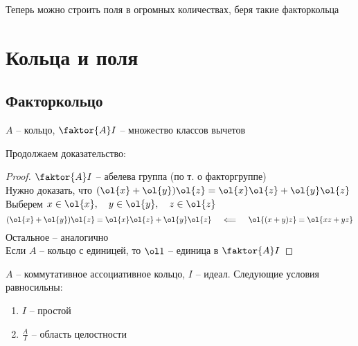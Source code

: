 Теперь можно строить поля в огромных количествах, беря такие факторкольца


\chapter{Кольца и поля}

\section{Факторкольцо}

\begin{remind}
	$ A $ -- кольцо, $ \faktor{A}I $ -- множество классов вычетов
\end{remind}

Продолжаем доказательство:

\begin{proof}
	$ \faktor{A}I $ -- абелева группа (по т. о факторгруппе) \\
	Нужно доказать, что $ (\ol{x} + \ol{y})\ol{z} = \ol{x}\ol{z} + \ol{y}\ol{z} $ \\
	Выберем $ x \in \ol{x}, \quad y \in \ol{y}, \quad z \in \ol{z} $
	$$ (\ol{x} + \ol{y})\ol{z} = \ol{x}\ol{z} + \ol{y}\ol{z} \quad \impliedby \quad \ol{(x + y)z} = \ol{xz + yz} $$
	Остальное -- аналогично \\
	Если $ A $ -- кольцо с единицей, то $ \ol1 $ -- единица в $ \faktor{A}I $
\end{proof}

\begin{theorem}
	$ A $ -- коммутативное ассоциативное кольцо, $ I $ -- идеал. Следующие условия равносильны:
	\begin{enumerate}
		\item\label{en:fak:1} $ I $ -- простой
		\item\label{en:fak:2} $ \frac{A}I $ -- область целостности
	\end{enumerate}
\end{theorem}


